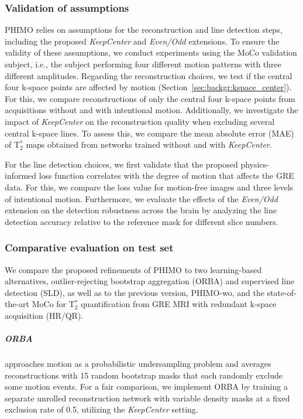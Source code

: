 \documentclass[AMA,STIX2COL]{MRM}
\newcommand{\tstar}[1]{{T$_2^*$}}
\begin{document}
\subsubsection{Validation of assumptions} \label{sec:methods:exp:validation}
PHIMO relies on assumptions for the reconstruction and line detection steps, including the proposed \textit{KeepCenter} and \textit{Even/Odd} extensions. To ensure the validity of these assumptions, we conduct experiments using the MoCo validation subject, i.e., the subject performing four different motion patterns with three different amplitudes.
%
Regarding the reconstruction choices, we test if the central four k-space points are affected by motion (Section~\ref{sec:backgr:kspace_center}). For this, we compare reconstructions of only the central four k-space points from acquisitions without and with intentional motion. Additionally, we investigate the impact of \textit{KeepCenter} on the reconstruction quality when excluding several central k-space lines. To assess this, we compare the mean absolute error (MAE) of \tstar{} maps obtained from networks trained without and with \textit{KeepCenter}. 

For the line detection choices, we first validate that the proposed physics-informed loss function correlates with the degree of motion that affects the GRE data. For this, we compare the loss value for motion-free images and three levels of intentional motion. Furthermore, we evaluate the effects of the \textit{Even/Odd} extension on the detection robustness across the brain by analyzing the line detection accuracy relative to the reference mask for different slice numbers. 


\subsubsection{Comparative evaluation on test set} \label{sec:methods:exp:comp}
We compare the proposed refinements of PHIMO  to two learning-based alternatives, outlier-rejecting bootstrap aggregation (ORBA)\cite{Oh_2021} and supervised line detection (SLD)\cite{Oksuz_2020,Eichhorn_2023}, as well as to the previous version, \mbox{PHIMO-wo},\cite{Eichhorn_2024} and the state-of-the-art MoCo for \tstar{} quantification from GRE MRI with redundant k-space acquisition (HR/QR).\cite{Noth_2014}

\subparagraph{ORBA \cite{Oh_2021}} approaches motion as a probabilistic undersampling problem and averages reconstructions with 15 random bootstrap masks that each randomly exclude some motion events. For a fair comparison, we implement ORBA by training a separate unrolled reconstruction network with variable density masks at a fixed exclusion rate of 0.5, utilizing the \textit{KeepCenter} setting.
\end{document}
